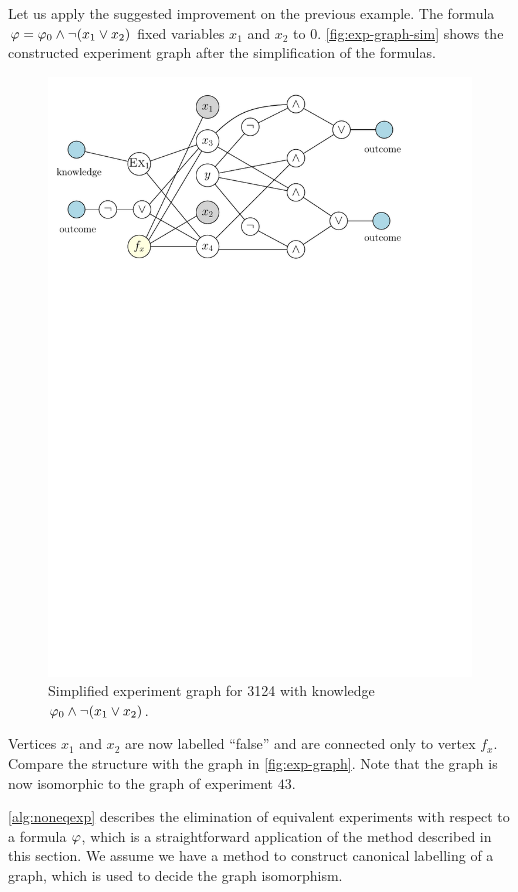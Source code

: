 \begin{example}
Let us apply the suggested improvement on the previous example.
The formula $\varphi = \varphi_0\wedge\neg(x_1\vee x_2)$ fixed variables
$x_1$ and $x_2$ to 0.
\autoref{fig:exp-graph-sim} shows the constructed experiment graph
  after the simplification of the formulas.

\begin{figure}[h]
\begin{center}
\includegraphics[width=.7\textwidth]{pictures/exp-graph-sim.pdf}
\caption{Simplified experiment graph for 3124 with knowledge $\varphi_0\wedge\neg(x_1\vee x_2)$.}
\label{fig:exp-graph-sim}
\end{center}
\end{figure}

Vertices $x_1$ and $x_2$ are now labelled ``false'' and are connected
  only to vertex $f_x$.
Compare the structure with the graph in \autoref{fig:exp-graph}.
Note that the graph is now isomorphic to the graph of experiment $43$.\eqed
\end{example}

\autoref{alg:noneqexp} describes the elimination of equivalent experiments with respect to a formula $\varphi$,
  which is a straightforward application of the method described in this section.
We assume we have a method to construct canonical labelling of a graph,
  which is used to decide the graph isomorphism.

